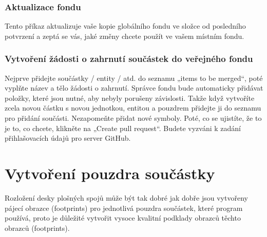 \documentclass[letterpaper,10pt,czech]{sphinxmanual}
\begin{document}
\subsection{Aktualizace fondu}
\label{\detokenize{pool-mgr:aktualizace-fondu}}
Tento příkaz aktualizuje vaše kopie globálního fondu ve složce 
od posledního potvrzení a zeptá se vás, jaké změny chcete
použít ve vašem místním fondu.


\subsection{Vytvoření žádosti o zahrnutí součástek do veřejného fondu}
\label{\detokenize{pool-mgr:vytvoreni-zadosti-o-zahrnuti-soucastek-do-verejneho-fondu}}
Nejprve přidejte součástky / entity / atd. do seznamu „items to be merged“,
poté vyplňte název a tělo žádosti o zahrnutí. Správce fondu bude
automaticky přidávat položky, které jsou nutné, aby nebyly porušeny závislosti. Takže když
vytvoříte zcela novou částku s novou jednotkou, entitou a pouzdrem
přidejte ji do seznamu pro přidání součásti. Nezapomeňte přidat nové
symboly. Poté, co se ujistíte, že to je to, co chcete, klikněte na „Create
pull request“. Budete vyzváni k zadání přihlašovacích údajů pro server GitHub.


\chapter{Vytvoření pouzdra součástky}
\label{\detokenize{create-package:vytvoreni-pouzdra-soucastky}}\label{\detokenize{create-package::doc}}
Rozložení desky plošných spojů může být tak dobré jak dobře jsou vytvořeny pájecí obrazce (footprints) pro jednotlivá pouzdra součástek, které program používá, proto je důležité vytvořit vysoce kvalitní podklady obrazců těchto obrazců (footprints).
\end{document}
